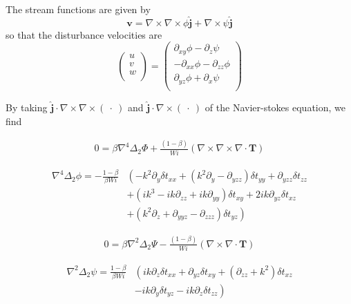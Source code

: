 \documentclass[12pt,a4paper]{article}
\newcommand{\stxx}{\delta t_{xx}}
\newcommand{\styy}{\delta t_{yy}}
\newcommand{\stzz}{\delta t_{zz}}
\newcommand{\stxy}{\delta t_{xy}}
\newcommand{\stxz}{\delta t_{xz}}
\newcommand{\styz}{\delta t_{yz}}
\newcommand{\curl}{\nabla \times}
\newcommand{\biharmop}{\nabla^{4}}
\newcommand{\dd}[1]{\partial_{#1}}
\begin{document}
The stream functions are given by 
\begin{equation}
    \mathbf{v} = \curl \curl \phi \hat{\mathbf{j}} + \curl \psi\hat{\mathbf{j}}
\end{equation}
so that the disturbance velocities are
\begin{equation}
    \begin{pmatrix}
	u \\
	v \\
	w \\
    \end{pmatrix}
    =
    \begin{pmatrix}
    \partial _{xy} \phi - \partial_{z} \psi \\
    -\partial_{xx} \phi - \partial_{zz} \phi \\
    \partial _{yz} \phi + \partial_{x} \psi \\
    \end{pmatrix}
    \label{eq:streamfunction_def}
\end{equation}

By taking $\hat{\mathbf{j}} \cdot \curl \curl (~ \cdot ~) $ and $\hat{\mathbf{j}} \cdot \curl (~ \cdot ~)$ of the Navier-stokes equation, we find

\begin{align}
    0 = \beta \biharmop \Delta_{2}\Phi + \frac{(1-\beta)}{Wi}\left( \curl \curl \nabla \cdot \mathbf{T} \right)
\end{align}

\begin{align}
    \biharmop  \Delta_{2} \phi = - \frac{1-\beta}{\beta Wi} &\left(-k^{2}\dd{y} \stxx + (k^{2}\dd{y} - \dd{yzz})\styy + \dd{yzz} \stzz \right. \nonumber \\ 
   & \left. + (ik^{3} - ik\dd{zz} + ik\dd{yy}) \stxy + 2ik\dd{yz}\stxz \right. \nonumber \\
   & \left. + (k^{2}\dd{z} + \dd{yyz} - \dd{zzz})\styz \right)
\label{eq:curlcurl}
\end{align}

\begin{align}
    0 = \beta \nabla^{2} \Delta_{2}\Psi - \frac{(1-\beta)}{Wi}\left( \curl \nabla \cdot \mathbf{T} \right)
\end{align}

\begin{align}
    \nabla ^{2} \Delta_{2} \psi = \frac{1-\beta}{\beta Wi} &\left( ik\dd{z}\stxx +\dd{yz} \stxy + (\dd{zz} +k^{2})\stxz \right. \nonumber \\ 
    & \left. - ik\dd{y} \styz - ik\dd{z} \stzz \right)
\label{eq:curl}
\end{align}
\end{document}
